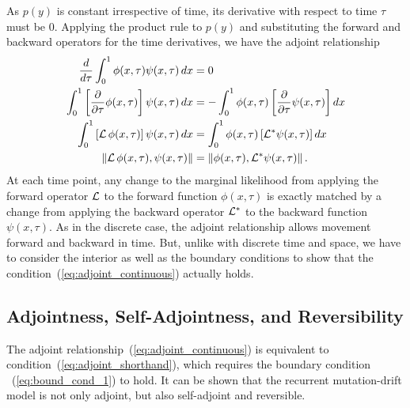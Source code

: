 \documentclass[preprint]{elsarticle}
\newcommand{\norm}[1]{\left\lVert#1\right\rVert}
\begin{document}
As $p(y)$ is constant irrespective of time, its derivative with respect to time $\tau$ must be $0$. Applying the product rule to $p(y)$ and substituting the forward and backward operators for the time derivatives, we have the adjoint relationship
\begin{equation}\label{eq:adjoint_continuous}
\begin{split}
\frac{d}{d\tau}\int_{0}^{1} \phi(x,\tau) \psi(x,\tau)\,dx &= 0\\
\int_{0}^{1} \left[\frac{\partial}{\partial\tau} \phi(x,\tau)\right] \psi(x,\tau)\,dx &= -\int_{0}^{1} \phi(x,\tau) \left[\frac{\partial}{\partial\tau} \psi(x,\tau)\right] dx\\
\int_{0}^{1} \left[{\cal L}\,\phi(x,\tau)\right] \psi(x,\tau)\,dx &= \int_{0}^{1}  \phi(x,\tau) \left[{\cal L}^{*} \psi(x,\tau)\right] dx\\
\norm{{\cal L}\,\phi(x,\tau), \psi(x,\tau)} &= \norm{ \phi(x,\tau),{\cal L}^{*} \psi(x,\tau)}.
\end{split}
\end{equation}
 At each time point, any change to the marginal likelihood from applying the forward operator ${\cal L}$ to the forward function $\phi(x,\tau)$ is exactly matched by a change from applying the backward operator ${\cal L}^{*}$ to the backward function $\psi(x,\tau)$. As in the discrete case, the adjoint relationship allows movement forward and backward in time. But, unlike with discrete time and space, we have to consider the interior as well as the boundary conditions to show that the condition~(\ref{eq:adjoint_continuous}) actually holds. 

\subsection{Adjointness, Self-Adjointness, and Reversibility}


The adjoint relationship~(\ref{eq:adjoint_continuous}) is equivalent to  condition~(\ref{eq:adjoint_shorthand}), which requires the boundary condition ~(\ref{eq:bound_cond_1}) to hold. It can be shown that the recurrent mutation-drift model is not only adjoint, but also self-adjoint and reversible.
\end{document}
